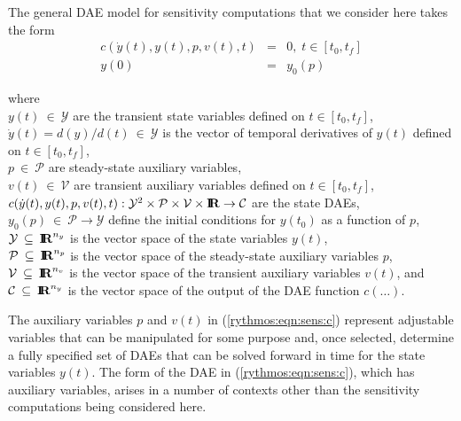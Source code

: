 \documentclass[pdf,ps2pdf,11pt]{SANDreport}
\begin{document}
The general DAE model for sensitivity computations that we consider here takes
the form
%
\begin{eqnarray}
c\left( \dot{y}(t), y(t), p, v(t), t \right) & = & 0,
\; t \in \left[ t_0, t_f \right] \label{rythmos:eqn:sens:c} \\
y(0) & = & y_0(p) \label{rythmos:eqn:sens:c:ic}
\end{eqnarray}
\begin{tabbing}
\hspace{4ex}where\hspace{1ex}\= \\
\>	$y(t) \:\in\:\mathcal{Y}$ are the transient state variables defined on $t\in[t_0,t_f]$, \\
\>	$\dot{y}(t) = d(y)/d(t)\:\in\:\mathcal{Y}$ is the vector of temporal derivatives of $y(t)$ defined on $t\in[t_0,t_f]$, \\
\>	$p \:\in\:\mathcal{P}$ are steady-state auxiliary variables, \\
\>	$v(t) \:\in\:\mathcal{V}$ are transient auxiliary variables defined on $t\in[t_0,t_f]$, \\
\>	$c(\dot{y}(t), y(t), p, v(t), t) :
		\mathcal{Y}^2 \times \mathcal{P} \times \mathcal{V} \times \mbox{\textbf{I}}\hspace{-0.6ex}\mbox{\textbf{R}}
		\rightarrow \mathcal{C}$ are the state DAEs, \\
\>	$y_0(p) \:\in\:\mathcal{P} \rightarrow \mathcal{Y}$ define the initial conditions for $y(t_0)$ as a function of $p$, \\
\>	$\mathcal{Y} \:\subseteq\:\mbox{\textbf{I}}\hspace{-0.6ex}\mbox{\textbf{R}}^{n_y}$ is the vector space of the state variables $y(t)$, \\
\>	$\mathcal{P} \:\subseteq\:\mbox{\textbf{I}}\hspace{-0.6ex}\mbox{\textbf{R}}^{n_p}$ is the vector space of the steady-state auxiliary variables $p$, \\
\>	$\mathcal{V} \:\subseteq\:\mbox{\textbf{I}}\hspace{-0.6ex}\mbox{\textbf{R}}^{n_v}$ is the vector space of the transient auxiliary variables $v(t)$, and \\
\>	$\mathcal{C} \:\subseteq\:\mbox{\textbf{I}}\hspace{-0.6ex}\mbox{\textbf{R}}^{n_y}$ is the vector space of the output of the DAE function $c(\ldots)$.
\end{tabbing}

The auxiliary variables $p$ and $v(t)$ in (\ref{rythmos:eqn:sens:c}) represent
adjustable variables that can be manipulated for some purpose and, once
selected, determine a fully specified set of DAEs that can be solved forward
in time for the state variables $y(t)$.  The form of the DAE in
(\ref{rythmos:eqn:sens:c}), which has auxiliary variables, arises in a number
of contexts other than the sensitivity computations being considered here.
\end{document}
